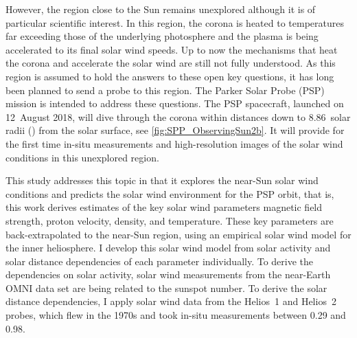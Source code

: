 However, the region close to the Sun remains unexplored although it is of particular scientific interest. In this region, the corona is heated to temperatures far exceeding those of the underlying photosphere and the plasma is being accelerated to its final solar wind speeds. Up to now the mechanisms that heat the corona and accelerate the solar wind are still not fully understood.
As this region is assumed to hold the answers to these open key questions, it has long been planned to send a probe to this region. The Parker Solar Probe (PSP) mission is intended to address these questions. The PSP spacecraft, launched on 12~August 2018, will dive through the corona within distances down to \num{8.86}~solar radii (\Rs) from the solar surface, see \autoref{fig:SPP_ObservingSun2b}. It will provide for the first time in-situ measurements and high-resolution images of the solar wind conditions in this unexplored region.
\begin{figure}[htb]
\end{figure}

This study addresses this topic in that it explores the near-Sun solar wind conditions and predicts the solar wind environment for the PSP orbit, that is, this work derives estimates of the key solar wind parameters magnetic field strength, proton velocity, density, and temperature. These key parameters are back-extrapolated to the near-Sun region, using an empirical solar wind model for the inner heliosphere.
I develop this solar wind model from solar activity and solar distance dependencies of each parameter individually. To derive the dependencies on solar activity, solar wind measurements from the near-Earth OMNI data set are being related to the sunspot number. To derive the solar distance dependencies, I apply solar wind data from the Helios~1 and Helios~2 probes, which flew in the 1970s and took in-situ measurements between \SI{0.29}{\au} and \SI{0.98}{\au}.

